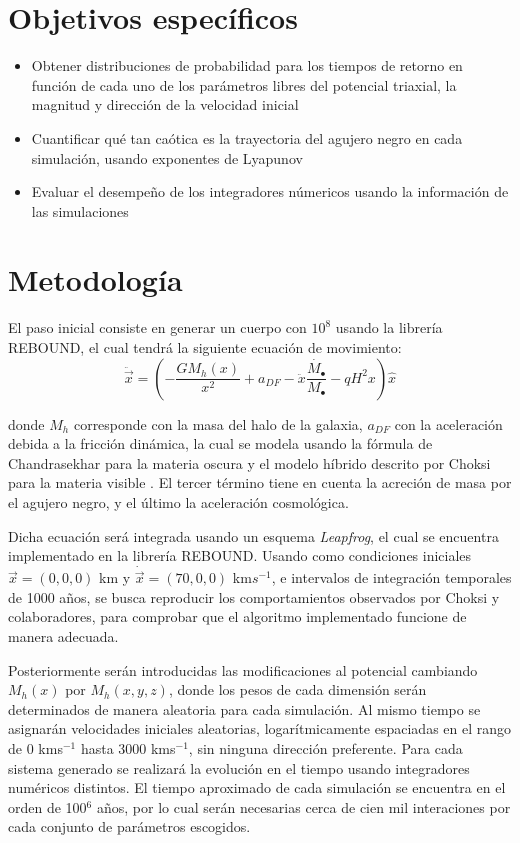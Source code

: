 \section{Objetivos específicos}
	\begin{itemize}
		\item Obtener distribuciones de probabilidad para los tiempos de retorno en función de cada uno de los par\'ametros libres del potencial triaxial, la magnitud y direcci\'on de la velocidad inicial
		\item Cuantificar qué tan caótica es la trayectoria del agujero negro en cada simulación, usando exponentes de Lyapunov
		\item Evaluar el desempe\~no de los integradores n\'umericos usando la informaci\'on de las simulaciones
	\end{itemize}
	
\section{Metodología}
	El paso inicial consiste en generar un cuerpo con $10^8$ \sm usando la librer\'ia REBOUND, el cual tendr\'a la siguiente ecuaci\'on de movimiento:
	\begin{equation}
		\ddot{\vec{x}} = \left(-\dfrac{GM_h(x)}{x^2} + a_{DF}-\ddot{x}\dfrac{\dot{M_\bullet}}{M_\bullet} -qH^2x\right)\hat{x}
	\end{equation}
	
	donde $M_h$ corresponde con la masa del halo de la galaxia, $a_{DF}$ con la aceleraci\'on debida a la fricci\'on din\'amica, la cual se modela usando la f\'ormula de Chandrasekhar para la materia oscura y el modelo h\'ibrido descrito por Choksi para la materia visible \cite{choksi2017recoiling}. El tercer t\'ermino tiene en cuenta la acreci\'on de masa por el agujero negro, y el \'ultimo la aceleraci\'on cosmol\'ogica.
	
	Dicha ecuaci\'on ser\'a integrada usando un esquema \textit{Leapfrog}, el cual se encuentra implementado en la librer\'ia REBOUND. Usando como condiciones iniciales $\vec{x} = (0,0,0)$ km y $\dot{\vec{x}} = (70, 0, 0)$ km$s^{-1}$, e intervalos de integraci\'on temporales de 1000 años, se busca reproducir los comportamientos observados por Choksi y colaboradores, para comprobar que el algoritmo implementado funcione de manera adecuada.
	
	Posteriormente ser\'an introducidas las modificaciones al potencial cambiando $M_h(x)$ por $M_h(x, y, z)$, donde los pesos de cada dimensi\'on ser\'an determinados de manera aleatoria para cada simulaci\'on. Al mismo tiempo se asignar\'an velocidades iniciales aleatorias, logar\'itmicamente espaciadas en el rango de 0 kms$^{-1}$ hasta 3000 kms$^{-1}$, sin ninguna direcci\'on preferente. Para cada sistema generado se realizar\'a la evoluci\'on en el tiempo usando integradores num\'ericos distintos. El tiempo aproximado de cada simulaci\'on se encuentra en el orden de 100$^6$ a\~nos, por lo cual ser\'an necesarias cerca de cien mil interaciones por cada conjunto de par\'ametros escogidos.
	
